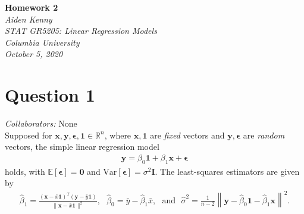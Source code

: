 \documentclass[10pt]{article}
\newcommand{\mycolab}[1]{\textcolor{colabcol}{\textsl{Collaborators:}} #1\\}
\begin{document}
\newcommand{\mytitle}{Homework 2}
\newcommand{\myauthor}{Aiden Kenny}
\newcommand{\myclass}{STAT GR5205: Linear Regression Models}
\newcommand{\myschool}{Columbia University}
\newcommand{\mydate}{October 5, 2020}
\begin{flushright}
    \textbf{\mytitle}\\[0.5em]
    \textsl{\myauthor}\\
    \textsl{\myclass}\\
    \textsl{\myschool}\\
    \textsl{\mydate}
\end{flushright} \vspace{1em}

\section{Question 1} \noindent
\mycolab{None}
Supposed for \(\mathbf{x},\mathbf{y},\bm{\epsilon}, \mathbf{1} \in \mathbb{R}^n\), where \(\mathbf{x},\mathbf{1}\) are \textsl{fixed} vectors and 
\(\mathbf{y},\bm{\epsilon}\) are 
\textsl{random} vectors, the simple linear regression model 
\begin{align*}
    \mathbf{y} = \beta_0 \mathbf{1} + \beta_1 \mathbf{x} + \bm{\epsilon}
\end{align*}
holds, with \(\mathbb{E}[\bm{\epsilon}] = \mathbf{0}\) and \(\mathrm{Var}[\bm{\epsilon}] = \sigma^2 \mathbf{I}\).
The least-squares estimators are given by
\begin{align*}
    \hat{\beta}_1 = \frac{(\mathbf{x} - \bar{x}\mathbf{1})^T(\mathbf{y} - \bar{y}\mathbf{1})}{\|\mathbf{x} - \bar{x}\mathbf{1}\|^2},
    ~~~
    \hat{\beta}_0 = \bar{y} - \hat{\beta}_1 \bar{x},
    ~~~\text{and}~~~
    \hat{\sigma}^2 = \frac{1}{n-2} \left\| \mathbf{y} - \hat{\beta}_0 \mathbf{1} - \hat{\beta}_1 \mathbf{x} \right\|^2.
\end{align*}
\end{document}
